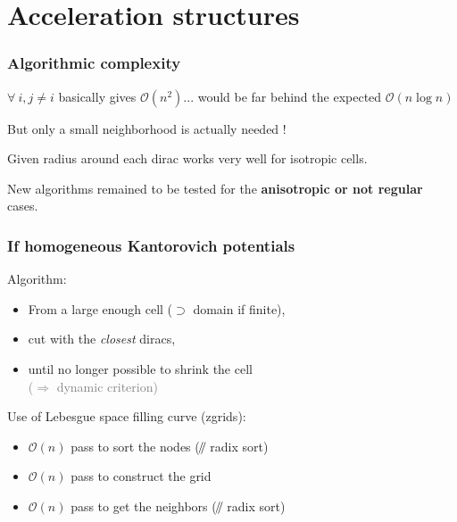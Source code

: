 \documentclass[aspectratio=169]{beamer}
\newcommand{\parallelsum}{\mathbin{\!/\mkern-5mu/\!}}
\begin{document}
\section{Acceleration structures}

\begin{frame}
    \frametitle{Algorithmic complexity}

    $\forall\ i, j \neq i $ basically gives $ \mathcal{O}( n^2 )$... would be far behind the 
      expected $\mathcal{O}( n \log{}n )$
    
    \vfill
    But only a small neighborhood is actually needed !

    \vfill
    Given radius around each dirac works very well for isotropic cells.
    
    \vfill
    New algorithms remained to be tested for the \textbf{anisotropic or not regular} cases.
\end{frame}

\begin{frame}
    \frametitle{If homogeneous Kantorovich potentials}

    \begin{minipage}[c][0.6\textheight][c]{0.6\textwidth}
        Algorithm:
        \begin{itemize}
            \item From a large enough cell ($\supset$ domain if finite),
            \item cut with the \textit{closest} diracs,
            \item until no longer possible to shrink the cell \\ \hfill \textcolor{gray}{($\Rightarrow$ dynamic criterion)}
        \end{itemize}

        \vfill
        Use of Lebesgue space filling curve (zgrids):
        \begin{itemize}
            \item $\mathcal{O}( n )$ pass to sort the nodes ($\parallelsum$ radix sort)
            \item $\mathcal{O}( n )$ pass to construct the grid
            \item $\mathcal{O}( n )$ pass to get the neighbors ($\parallelsum$ radix sort)
        \end{itemize}
    \end{minipage}
    \textwidth
    \begin{minipage}{0.35\textwidth}
        \begin{center}
            
        \end{center}
    \end{minipage}
\end{frame}
\end{document}
